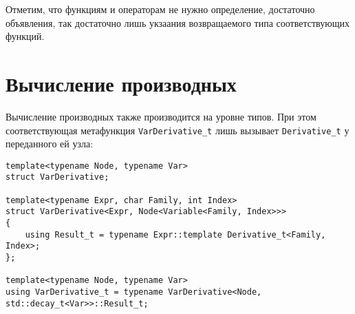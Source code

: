 \documentclass[11pt,a4paper]{article}
\begin{document}
Отметим, что функциям и операторам не нужно определение, достаточно объявления, так
достаточно лишь укзаания возвращаемого типа соответствующих функций.

\section{Вычисление производных}

Вычисление производных также производится на уровне типов. При этом соответствующая
метафункция \texttt{VarDerivative\_t} лишь вызывает \texttt{Derivative\_t} у
переданного ей узла:

\begin{lstlisting}
template<typename Node, typename Var>
struct VarDerivative;

template<typename Expr, char Family, int Index>
struct VarDerivative<Expr, Node<Variable<Family, Index>>>
{
	using Result_t = typename Expr::template Derivative_t<Family, Index>;
};

template<typename Node, typename Var>
using VarDerivative_t = typename VarDerivative<Node, std::decay_t<Var>>::Result_t;
\end{lstlisting}
\end{document}
